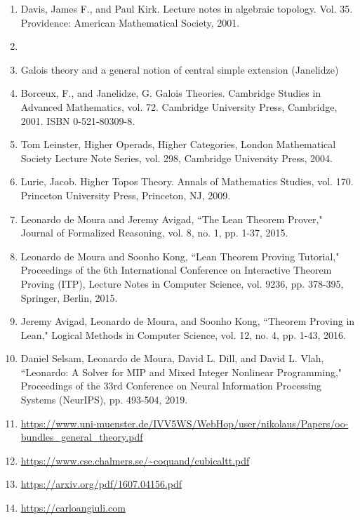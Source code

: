 \documentclass{book}
\theoremstyle{definition}
\begin{document}
\fi




\begin{enumerate}
\item Davis, James F., and Paul Kirk. Lecture notes in algebraic topology. Vol. 35. Providence: American Mathematical Society, 2001.
\item 
\item Galois theory and a general notion of central simple extension (Janelidze) 
\item Borceux, F., and Janelidze, G. Galois Theories. Cambridge Studies in Advanced Mathematics, vol. 72. Cambridge University Press, Cambridge, 2001. ISBN 0-521-80309-8.
\item Tom Leinster, Higher Operads, Higher Categories, London Mathematical Society Lecture Note Series, vol. 298, Cambridge University Press, 2004.
\item Lurie, Jacob. Higher Topos Theory. Annals of Mathematics Studies, vol. 170. Princeton University Press, Princeton, NJ, 2009.
\item Leonardo de Moura and Jeremy Avigad, ``The Lean Theorem Prover," Journal of Formalized Reasoning, vol. 8, no. 1, pp. 1-37, 2015.
\item Leonardo de Moura and Soonho Kong, ``Lean Theorem Proving Tutorial," Proceedings of the 6th International Conference on Interactive Theorem Proving (ITP), Lecture Notes in Computer Science, vol. 9236, pp. 378-395, Springer, Berlin, 2015.
\item Jeremy Avigad, Leonardo de Moura, and Soonho Kong, ``Theorem Proving in Lean," Logical Methods in Computer Science, vol. 12, no. 4, pp. 1-43, 2016.
\item Daniel Selsam, Leonardo de Moura, David L. Dill, and David L. Vlah, ``Leonardo: A Solver for MIP and Mixed Integer Nonlinear Programming," Proceedings of the 33rd Conference on Neural Information Processing Systems (NeurIPS), pp. 493-504, 2019.
\item \url{https://www.uni-muenster.de/IVV5WS/WebHop/user/nikolaus/Papers/oo-bundles_general_theory.pdf}
\item \url{https://www.cse.chalmers.se/~coquand/cubicaltt.pdf}
\item \url{https://arxiv.org/pdf/1607.04156.pdf}
\item \url{https://carloangiuli.com}
\end{enumerate}
\end{document}
